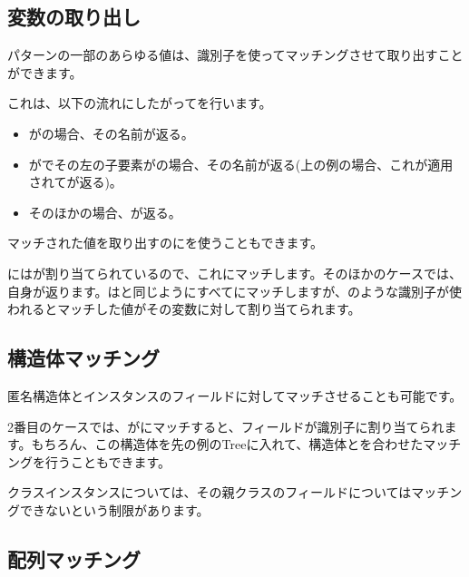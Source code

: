 \subsection{変数の取り出し}
\label{lf-pattern-matching-variable-capture}

パターンの一部のあらゆる値は、識別子を使ってマッチングさせて取り出すことができます。


これは、以下の流れにしたがってを行います。

\begin{itemize}
	\item {}がの場合、その名前が返る。
	\item {}がでその左の子要素がの場合、その名前が返る(上の例の場合、これが適用されてが返る)。
	\item そのほかの場合、が返る。
\end{itemize}

マッチされた値を取り出すのに\expr{=}を使うこともできます。


にはが割り当てられているので、これにマッチします。そのほかのケースでは、自身が返ります。はと同じようにすべてにマッチしますが、のような識別子が使われるとマッチした値がその変数に対して割り当てられます。

\subsection{構造体マッチング}
\label{lf-pattern-matching-structure}

匿名構造体とインスタンスのフィールドに対してマッチさせることも可能です。


2番目のケースでは、がにマッチすると、フィールドが識別子に割り当てられます。もちろん、この構造体を先の例のTreeに入れて、構造体とを合わせたマッチングを行うこともできます。

クラスインスタンスについては、その親クラスのフィールドについてはマッチングできないという制限があります。

\subsection{配列マッチング}
\label{lf-pattern-matching-array}

